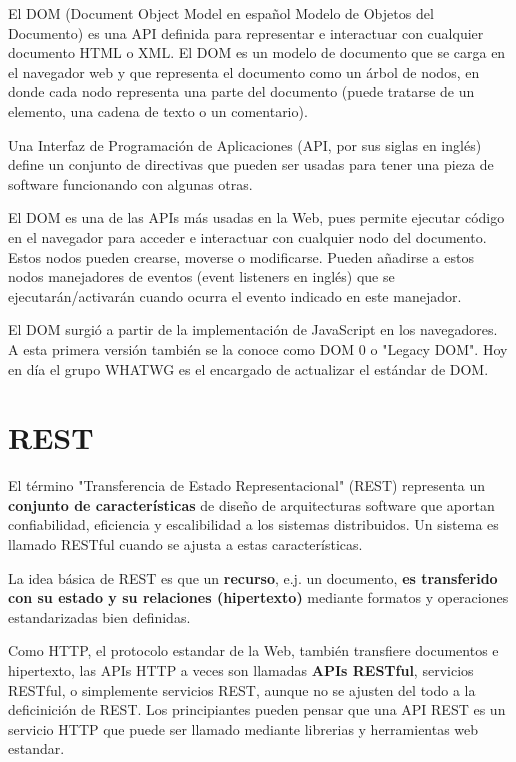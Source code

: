 El DOM (Document Object Model en español Modelo de Objetos del Documento) es una API definida para representar e interactuar con cualquier documento HTML o XML. El DOM es un modelo de documento que se carga en el navegador web y que representa el documento como un árbol de nodos, en donde cada nodo representa una parte del documento (puede tratarse de un elemento, una cadena de texto o un comentario).

\begin{remark}
Una Interfaz de Programación de Aplicaciones (API, por sus siglas en inglés) define un conjunto de directivas que pueden ser usadas para tener una pieza de software funcionando con algunas otras.
\end{remark}

El DOM es una de las APIs más usadas en la Web, pues permite ejecutar código en el navegador para acceder e interactuar con cualquier nodo del documento. Estos nodos pueden crearse, moverse o modificarse. Pueden añadirse a estos nodos manejadores de eventos (event listeners en inglés) que se ejecutarán/activarán cuando ocurra el evento indicado en este manejador.

El DOM surgió a partir de la implementación de JavaScript en los navegadores. A esta primera versión también se la conoce como DOM 0 o "Legacy DOM". Hoy en día el grupo WHATWG es el encargado de actualizar el estándar de DOM.


\section{REST}

\cite{mdn}El término "Transferencia de Estado Representacional" (REST) representa un \textbf{conjunto de características} de diseño de arquitecturas software que aportan confiabilidad, eficiencia y escalibilidad a los sistemas distribuidos. Un sistema es llamado RESTful cuando se ajusta a estas características.

La idea básica de REST es que un \textbf{recurso}, e.j. un documento, \textbf{es transferido con su estado y su relaciones (hipertexto)} mediante formatos y operaciones estandarizadas bien definidas.

Como HTTP, el protocolo estandar de la Web, también transfiere documentos e hipertexto, las APIs HTTP a veces son llamadas\textbf{ APIs RESTful}, servicios RESTful, o simplemente servicios REST, aunque no se ajusten del todo a la deficinición de REST. Los principiantes pueden pensar que una API REST es un servicio HTTP que puede ser llamado mediante librerias y herramientas web estandar.

